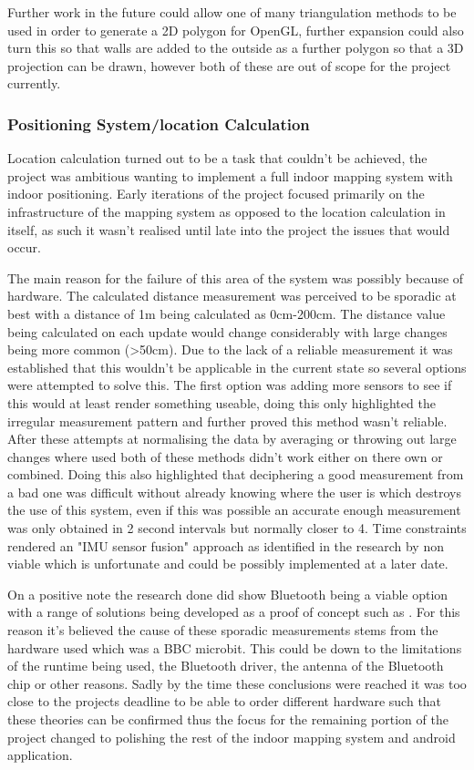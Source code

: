 Further work in the future could allow one of many triangulation methods to be used in order to generate a 2D polygon for OpenGL, further expansion could also turn this so that walls are added to the outside as a further polygon so that a 3D projection can be drawn, however both of these are out of scope for the project currently.


\subsubsection{Positioning System/location Calculation}
Location calculation turned out to be a task that couldn't be achieved, the project was ambitious wanting to implement a full indoor mapping system with indoor positioning. Early iterations of the project focused primarily on the infrastructure of the mapping system as opposed to the location calculation in itself, as such it wasn't realised until late into the project the issues that would occur.

The main reason for the failure of this area of the system was possibly because of hardware. The calculated distance measurement was perceived to be sporadic at best with a distance of 1m being calculated as 0cm-200cm. The distance value being calculated on each update would change considerably with large changes being more common (\textgreater 50cm). Due to the lack of a reliable measurement it was established that this wouldn't be applicable in the current state so several options were attempted to solve this. The first option was adding more sensors to see if this would at least render something useable, doing this only highlighted the irregular measurement pattern and further proved this method wasn't reliable.
After these attempts at normalising the data by averaging or throwing out large changes where used both of these methods didn't work either on there own or combined. Doing this also highlighted that deciphering a good measurement from a bad one was difficult without already knowing where the user is which destroys the use of this system, even if this was possible an accurate enough measurement was only obtained in 2 second intervals but normally closer to 4. Time constraints rendered an "IMU sensor fusion" approach as identified in the research by \cite{comer_uwb_vs_ble} non viable which is unfortunate and could be possibly implemented at a later date.

On a positive note the research done did show Bluetooth being a viable option with a range of solutions being developed as a proof of concept such as \cite{kingatua_2020_bluetooth}. For this reason it's believed the cause of these sporadic measurements stems from the hardware used which was a BBC microbit. This could be down to the limitations of the runtime being used, the Bluetooth driver, the antenna of the Bluetooth chip or other reasons. Sadly by the time these conclusions were reached it was too close to the projects deadline to be able to order different hardware such that these theories can be confirmed thus the focus for the remaining portion of the project changed to polishing the rest of the indoor mapping system and android application.

